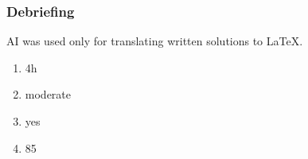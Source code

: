 \documentclass[11pt]{article}
\begin{document}
\subsubsection*{Debriefing}
AI was used only for translating written solutions to LaTeX.

\begin{enumerate}
\item 4h
\item moderate
\item yes
\item 85
\end{enumerate}
\end{document}
